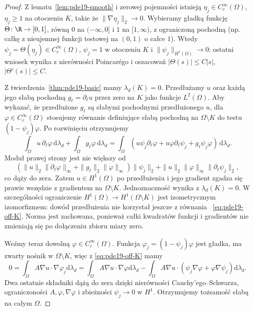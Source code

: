\begin{proof}
Z lematu~\ref{lem:pde19-smooth} i zerowej pojemności
istnieją $\eta_j\in C_c^\infty(\Omega)$, $\eta_j\ge1$
na otoczeniu $K$, takie że $\|\nabla\eta_j\|_2\to0$.
Wybieramy gładką funkcję $\Theta\colon\R\to[0,1]$,
równą $0$ na $(-\infty,0]$ i $1$ na $[1,\infty)$,
z ograniczoną pochodną (np. całkę z nieujemnej
funkcji testowej na $(0,1)$ o całce $1$). Wtedy
$\psi_j=\Theta(\eta_j)\in C_c^\infty(\Omega)$,
$\psi_j=1$ w otoczeniu $K$ i
$\|\psi_j\|_{H^1(\Omega)}\to0$: ostatni wniosek wynika
z nierówności Poincarégo i oszacowań
$|\Theta(s)|\le C|s|$, $|\Theta'(s)|\le C$.

Z twierdzenia~\ref{thm:pde19-basic} mamy $\lambda_d(K)=0$.
Przedłużamy $u$ oraz każdą jego słabą pochodną
$g_\ell=\partial_\ell u$ przez zero na $K$ jako funkcje
$L^2(\Omega)$. Aby wykazać, że przedłużone $g_\ell$
są słabymi pochodnymi przedłużonego $u$, dla
$\varphi\in C_c^\infty(\Omega)$ stosujemy równanie
definiujące słabą pochodną na $\Omega\setminus K$
do testu $(1-\psi_j)\varphi$. Po rozwinięciu otrzymujemy
\[
 \int_\Omega u\,\partial_\ell\varphi\,\mathrm d\lambda_d
 +\int_\Omega g_\ell\varphi\,\mathrm d\lambda_d
 =
 \int_\Omega (u\psi_j\partial_\ell\varphi+
 u\varphi\partial_\ell\psi_j+g_\ell\psi_j\varphi)
 \,\mathrm d\lambda_d.
\]
Moduł prawej strony jest nie większy od
\[
 (\|u\|_2\|\partial_\ell\varphi\|_\infty+
 \|g_\ell\|_2\|\varphi\|_\infty)\|\psi_j\|_2+
 \|u\|_2\|\varphi\|_\infty\|\partial_\ell\psi_j\|_2,
\]
co dąży do zera. Zatem $u\in H^1(\Omega)$ po
przedłużeniu i jego gradient zgadza się prawie wszędzie
z gradientem na $\Omega\setminus K$.
Jednoznaczność wynika z $\lambda_d(K)=0$.
W szczególności ograniczenie $H^1(\Omega)\to
H^1(\Omega\setminus K)$ jest izometrycznym izomorfizmem:
dowód przedłużenia nie korzystał jeszcze z równania
~\eqref{eq:pde19-off-K}. Norma jest zachowana,
ponieważ całki kwadratów funkcji i gradientów
nie zmieniają się po dołączeniu zbioru miary zero.

Weźmy teraz dowolną $\varphi\in C_c^\infty(\Omega)$.
Funkcja $\varphi_j=(1-\psi_j)\varphi$ jest gładka,
ma zwarty nośnik w $\Omega\setminus K$, więc z
\eqref{eq:pde19-off-K} mamy
\[
 0=\int_\Omega A\nabla u\cdot\nabla\varphi_j
 \mathrm d\lambda_d
 =\int_\Omega A\nabla u\cdot\nabla\varphi
 \mathrm d\lambda_d
 -\int_\Omega A\nabla u\cdot
 (\psi_j\nabla\varphi+\varphi\nabla\psi_j)\mathrm d\lambda_d.
\]
Dwa ostatnie składniki dążą do zera dzięki
nierówności Cauchy'ego--Schwarza, ograniczoności
$A,\varphi,\nabla\varphi$ i zbieżności
$\psi_j\to0$ w $H^1$. Otrzymujemy tożsamość słabą
na całym $\Omega$.
\end{proof}

